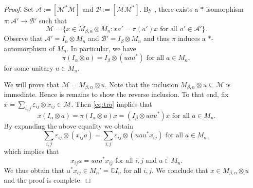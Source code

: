 \documentclass[11pt]{amsart}
\numberwithin{equation}{section}
\theoremstyle{plain}
\theoremstyle{definition}
\theoremstyle{remark}
\newcommand{\A}{{\mathcal{A}}}
\newcommand{\B}{{\mathcal{B}}}
\newcommand{\M}{{\mathcal{M}}}
\newcommand{\eps}{\varepsilon}
\def\al{\alpha}
\def\be{\beta}
\newcommand{\bC}{\mathbb{C}}
\newcommand{\foral}{\text{ for all }}
\begin{document}
\begin{proof}
Set $\A:=[\M^*\M]$ and $\B:=[\M\M^*]$. By \cite[Theorem 3.2]{Ele12}, there exists a $*$-isomorphism $\pi \colon \A'\to\B'$ such that
\begin{equation} \label{eq:tro}
\M=\{x\in M_{\beta,\alpha}\otimes M_n: xa'=\pi(a')x \foral a'\in \A'\}.
\end{equation}
Observe that $\A'=I_\alpha\otimes M_n$ and $\B'=I_\beta\otimes M_n$ and thus $\pi$ induces a $*$-automorphism of $M_n$. In particular, we have
\[
\pi(I_\alpha\otimes a)=I_\beta\otimes (uau^*) \foral a\in M_n,
\]
for some unitary $u\in M_n$.

We will prove that $\M= M_{\be, \al}\otimes u$. Note that the inclusion $M_{\beta,\alpha}\otimes u\subseteq \M$ is immediate. Hence is remains to show the reverse inclusion. 
To that end, fix $x=\sum_{i,j}\eps_{ij}\otimes x_{ij}\in \M$. Then \eqref{eq:tro} implies that
\[
x(I_\alpha\otimes a)= \pi(I_\alpha\otimes a) x= (I_\beta\otimes uau^*)x \foral a\in M_n.
\]
By expanding the above equality we obtain
\[
\sum_{i,j}\eps_{ij}\otimes (x_{ij} a)=\sum_{i,j}\eps_{ij}\otimes (uau^* x_{ij}) \foral a \in M_n,
\]
which implies that
\[
x_{ij}a=u a u^* x_{ij} \foral i,j \text{ and } a\in M_n.
\]
We thus obtain that $u^*x_{ij}\in M_n'=\bC I_n$ for all $i,j$. We conclude that $x\in M_{\beta,\alpha}\otimes u$ and the proof is complete.
\end{proof}
\end{document}
